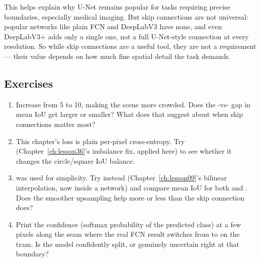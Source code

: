 This helps explain why U-Net remains popular for tasks requiring precise boundaries, especially medical imaging. But skip connections are not universal: popular networks like plain FCN and DeepLabV3 have none, and even DeepLabV3+ adds only a single one, not a full U-Net-style connection at every resolution. So while skip connections are a useful tool, they are not a requirement --- their value depends on how much fine spatial detail the task demands.

\subsection*{Exercises}
\begin{enumerate}
  \item Increase  from 5 to 10, making the scene more crowded. Does the -vs- gap in mean IoU get larger or smaller? What does that suggest about when skip connections matter most?
  \item This chapter's loss is plain per-pixel cross-entropy. Try  (Chapter~\ref{ch:lesson36}'s imbalance fix, applied here) to see whether it changes the circle/square IoU balance.
  \item {} was used for simplicity. Try  instead (Chapter~\ref{ch:lesson09}'s bilinear interpolation, now inside a network) and compare mean IoU for both  and . Does the smoother upsampling help more or less than the skip connection does?
  \item Print the confidence (softmax probability of the predicted class) at a few pixels along the seam where the real FCN result switches from  to  on the tram. Is the model confidently split, or genuinely uncertain right at that boundary?
\end{enumerate}

\vfill
{}
